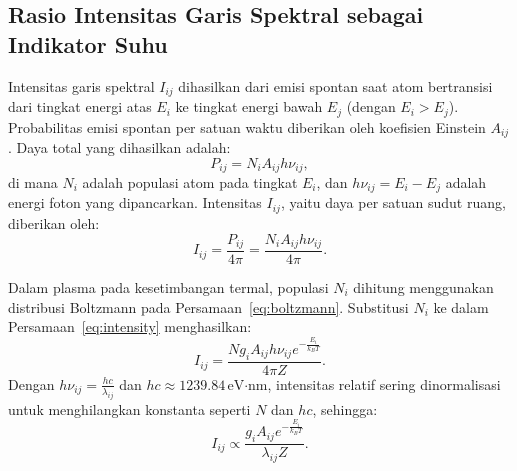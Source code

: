 \subsection{Rasio Intensitas Garis Spektral sebagai Indikator Suhu}

Intensitas garis spektral \( I_{ij} \) dihasilkan dari emisi spontan saat atom bertransisi dari tingkat energi atas \( E_i \) ke tingkat energi bawah \( E_j \) (dengan \( E_i > E_j \)). Probabilitas emisi spontan per satuan waktu diberikan oleh koefisien Einstein \( A_{ij} \). Daya total yang dihasilkan adalah:
\begin{equation}
P_{ij} = N_i A_{ij} h \nu_{ij}, \label{eq:power}
\end{equation}
di mana \( N_i \) adalah populasi atom pada tingkat \( E_i \), dan \( h \nu_{ij} = E_i - E_j \) adalah energi foton yang dipancarkan. Intensitas \( I_{ij} \), yaitu daya per satuan sudut ruang, diberikan oleh:
\begin{equation}
I_{ij} = \frac{P_{ij}}{4\pi} = \frac{N_i A_{ij} h \nu_{ij}}{4\pi}. \label{eq:intensity}
\end{equation}

Dalam plasma pada kesetimbangan termal, populasi \( N_i \) dihitung menggunakan distribusi Boltzmann pada Persamaan~\eqref{eq:boltzmann}. Substitusi \( N_i \) ke dalam Persamaan~\eqref{eq:intensity} menghasilkan:
\begin{equation}
I_{ij} = \frac{N g_i A_{ij} h \nu_{ij} e^{-\frac{E_i}{k_B T}}}{4\pi Z}. \label{eq:intensity_full}
\end{equation}
Dengan \( h \nu_{ij} = \frac{h c}{\lambda_{ij}} \) dan \( h c \approx 1239.84 \, \text{eV·nm} \), intensitas relatif sering dinormalisasi untuk menghilangkan konstanta seperti \( N \) dan \( h c \), sehingga:
\begin{equation}
I_{ij} \propto \frac{g_i A_{ij} e^{-\frac{E_i}{k_B T}}}{\lambda_{ij} Z}. \label{eq:intensity_relative}
\end{equation}

